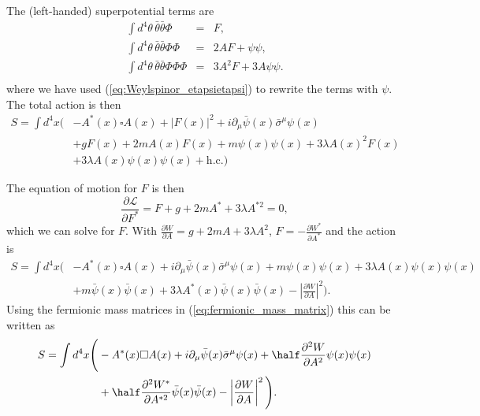 \documentclass[notes.tex]{subfiles}
\begin{document}
\begin{Answer}
The (left-handed) superpotential terms are
\begin{eqnarray*}
\int d^4\theta\, \bar\theta\bar\theta\Phi &=&  F, \\
\int d^4\theta\, \bar\theta\bar\theta\Phi\Phi &=& 2AF+\psi\psi, \\
\int d^4\theta\, \bar\theta\bar\theta\Phi\Phi\Phi &=& 3A^2F+3A\psi\psi.\\
\end{eqnarray*}
where we have used (\ref{eq:Weylspinor_etapsietapsi}) to rewrite the terms with $\psi$. The total action is then 
\begin{equation}
\begin{split}
    S = \int d^4x \big(&-A^*(x)\square A(x)+|F(x)|^2+i\partial_\mu\bar\psi(x)\bar\sigma^\mu\psi(x) \\
    &+ gF(x)+ 2mA(x)F(x)+m\psi(x)\psi(x)+3\lambda A(x)^2F(x) \\
    &+ 3\lambda A(x)\psi(x)\psi(x)+\text{h.c.} \big)
\end{split}
\end{equation}

The equation of motion for $F$ is then
\begin{equation}
\frac{\partial\mathcal{L}}{\partial F^*}=F+g+2mA^*+3\lambda A^{*2}=0,
\end{equation}
which we can solve for $F$. With $\frac{\partial W}{\partial A}=g+2mA+3\lambda A^2$, $F=-\frac{\partial W^*}{\partial A^*}$ and the action is
\begin{equation}
\begin{split}
    S = \int d^4x \Bigg(&-A^*(x)\square A(x)+i\partial_\mu\bar\psi(x)\bar\sigma^\mu\psi(x)+m\psi(x)\psi(x)+3\lambda A(x)\psi(x)\psi(x) \\
    &+ m\bar\psi(x)\bar\psi(x)+3\lambda A^*(x)\bar\psi(x)\bar\psi(x) -\left|\frac{\partial W}{\partial A}\right|^2 \Bigg).
\end{split}
\end{equation}
Using the fermionic mass matrices in (\ref{eq:fermionic_mass_matrix}) this can be written as
\begin{equation}
\begin{split}
    S = \int d^4x \Bigg(&-A^*(x)\square A(x)+i\partial_\mu\bar\psi(x)\bar\sigma^\mu\psi(x)+\half\frac{\partial^2 W}{\partial A^2}\psi(x)\psi(x) \\
    &+ \half\frac{\partial^2 W^*}{\partial A^{*2}}\bar\psi(x)\bar\psi(x)-\left|\frac{\partial W}{\partial A}\right|^2 \Bigg).
\end{split}
\end{equation}

\end{Answer}
\end{document}
